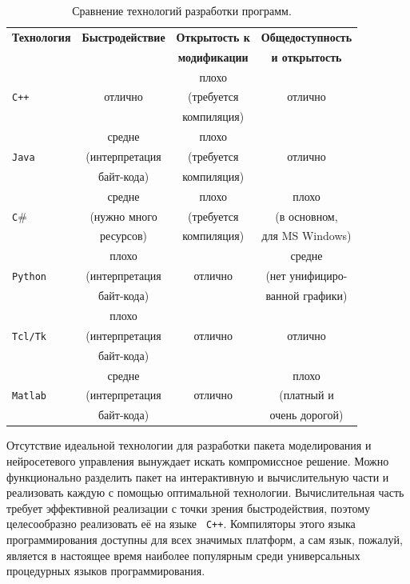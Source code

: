 \begin{table}[ht]
\centering
\caption{Сравнение технологий разработки программ.}
\label{tabl:sdk_tech}
\begin{tabular}{|l|c|c|c|}
\hline
\bf Технология & \bf Быстродействие & \bf Открытость к & \bf Общедоступность \\
             &                & \bf модификации  & \bf и открытость \\
\hline
             &                &  плохо       &              \\
\tt C++      &   отлично      & (требуется   & отлично      \\
             &                & компиляция)  &              \\
\hline
             &   средне       &  плохо       &              \\
\tt Java     & (интерпретация & (требуется   & отлично      \\
             & байт-кода)     & компиляция)  &              \\
\hline
             &   средне       &  плохо       & плохо        \\
\tt C$\#$    & (нужно много   & (требуется   & (в основном, \\
             & ресурсов)      & компиляция)  & для MS Windows) \\
\hline
            &   плохо        &              & средне       \\
\tt Python  & (интерпретация & отлично      & (нет унифициро- \\
            & байт-кода)     &              & ванной графики) \\
\hline
           &   плохо        &              &              \\
\tt Tcl/Tk & (интерпретация & отлично      & отлично      \\
           & байт-кода)     &              &              \\
\hline
           &   средне       &              & плохо        \\
\tt Matlab & (интерпретация & отлично      & (платный и   \\
           & байт-кода)     &              & очень дорогой) \\
\hline
\end{tabular}
\end{table}

Отсутствие идеальной технологии для разработки пакета моделирования и
нейросетевого управления вынуждает искать компромиссное решение.
Можно функционально разделить пакет на интерактивную и вычислительную
части и реализовать каждую с помощью оптимальной технологии.
Вычислительная часть требует эффективной реализации с точки зрения
быстродействия, поэтому целесообразно реализовать её на языке {\tt
  C++}.  Компиляторы этого языка программирования доступны для всех
значимых платформ, а сам язык, пожалуй, является в настоящее время
наиболее популярным среди универсальных процедурных языков
программирования.

